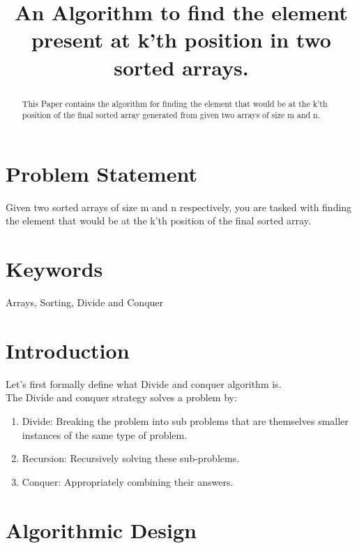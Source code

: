 \documentclass[conference]{IEEEtran}
\begin{document}
\title{An Algorithm to find the element present at k'th position  in two sorted arrays.\\
}
\author{
\and
{}
\and
{}
}

\maketitle

\begin{abstract}
This Paper contains the algorithm for finding the element that would be at the k'th position of the final sorted array generated from given two arrays of size m and n.
\end{abstract}

\section{Problem Statement}
Given two sorted arrays of size m and n respectively, you are tasked
with finding the element that would be at the k’th position of the
final sorted array.

\section{Keywords}
Arrays, Sorting, Divide and Conquer

\section{Introduction}
Let’s  first  formally  define  what Divide and conquer algorithm is.\\
The Divide and conquer strategy solves a problem by:
\begin{enumerate}
\item Divide: Breaking the problem into sub problems that are themselves smaller instances of the same type of problem.
\item Recursion: Recursively solving these sub-problems.
\item Conquer: Appropriately combining their answers.
\end{enumerate}
\section{Algorithmic Design}
\end{document}
